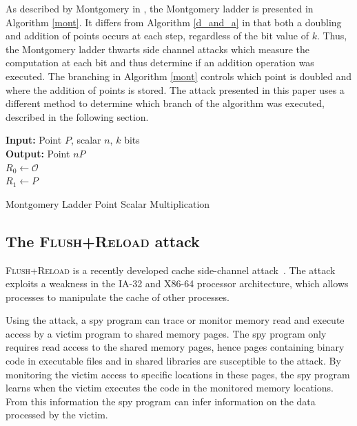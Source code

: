 \documentclass{llncs}
\begin{document}
As described by Montgomery in \cite{montgomery87speeding}, the Montgomery ladder is presented in Algorithm \ref{mont}. It differs from Algorithm \ref{d_and_a} in that both a doubling and addition of points occurs at each step, regardless of the bit value of $k$. Thus, the Montgomery ladder thwarts side channel attacks which measure the computation at each bit and thus determine if an addition operation was executed. The branching in Algorithm \ref{mont} controls which point is doubled and where the addition of points is stored. The attack presented in this paper uses a different method to determine which branch of the algorithm was executed, described in the following section.

\vspace{-0.5cm}
\begin{algorithm}[htb]\label{mont}
 \SetAlgoLined
{\bf Input:} Point $P$, scalar $n$, $k$ bits\\
{\bf Output:} Point $nP$\\
$R_0\gets \mathcal{O}$\\
$R_1\gets P$\\
 \caption{Montgomery Ladder Point Scalar Multiplication}
\end{algorithm}\vspace{-0.5cm}




\newpage

\subsection{The \textsc{Flush+Reload} attack}
\textsc{Flush+Reload} is a recently developed cache side-channel attack~\cite{yarom13flush}.
The attack exploits a weakness in the IA-32 and X86-64 processor architecture, which allows
processes to manipulate the cache of other processes.

Using the attack, a spy program can trace or monitor memory read and execute access by a victim program to shared memory pages.
The spy program only requires read access to the shared memory pages, hence pages containing binary code in executable files and
in shared libraries are susceptible to the attack.
By monitoring the victim access to specific locations in these pages, the spy program learns when the victim
executes the code in the monitored memory locations.
From this information the spy program can infer information on the data processed by the victim.
\end{document}
